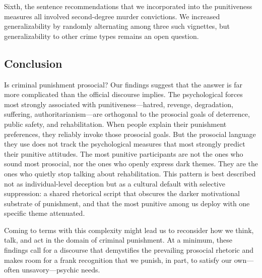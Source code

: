 Sixth, the sentence recommendations that we incorporated into the punitiveness measures all involved second-degree murder convictions. We increased generalizability by randomly alternating among three such vignettes, but generalizability to other crime types remains an open question.

\subsection{Conclusion}

Is criminal punishment prosocial? Our findings suggest that the answer is far more complicated than the official discourse implies. The psychological forces most strongly associated with punitiveness---hatred, revenge, degradation, suffering, authoritarianism---are orthogonal to the prosocial goals of deterrence, public safety, and rehabilitation. When people explain their punishment preferences, they reliably invoke those prosocial goals. But the prosocial language they use does not track the psychological measures that most strongly predict their punitive attitudes. The most punitive participants are not the ones who sound most prosocial, nor the ones who openly express dark themes. They are the ones who quietly stop talking about rehabilitation. This pattern is best described not as individual-level deception but as a cultural default with selective suppression: a shared rhetorical script that obscures the darker motivational substrate of punishment, and that the most punitive among us deploy with one specific theme attenuated.

Coming to terms with this complexity might lead us to reconsider how we think, talk, and act in the domain of criminal punishment. At a minimum, these findings call for a discourse that demystifies the prevailing prosocial rhetoric and makes room for a frank recognition that we punish, in part, to satisfy our own---often unsavory---psychic needs.